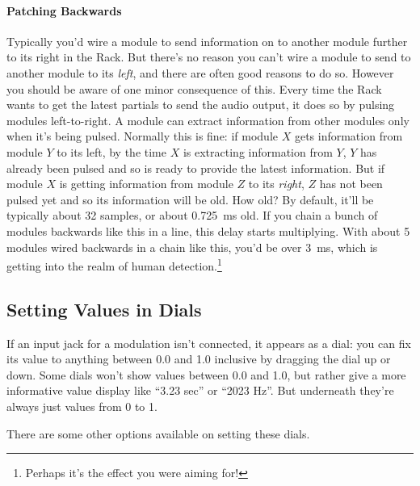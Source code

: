 \documentclass{article}
\begin{document}
\paragraph{Patching Backwards}  Typically you'd wire a module to send information on to another module further to its right in the Rack.  But there's no reason you can't wire a module to send to another module to its {\it left}, and there are often good reasons to do so.  However you should be aware of one minor consequence of this.  Every time the Rack wants to get the latest partials to send the audio output, it does so by pulsing modules left-to-right.  A module can extract information from other modules only when it's being pulsed.  Normally this is fine: if module \(X\) gets information from module \(Y\) to its left, by the time \(X\) is extracting information from \(Y\), \(Y\) has already been pulsed and so is ready to provide the latest information.  But if module \(X\) is getting information from module \(Z\) to its {\it right}, \(Z\) has not been pulsed yet and so its information will be old.  How old?  By default, it'll be typically about 32 samples, or about 0.725~ms old.  If you chain a bunch of modules backwards like this in a line, this delay starts multiplying.   With about 5 modules wired backwards in a chain like this, you'd be over 3~ms, which is getting into the realm of human detection.\footnote{Perhaps it's the effect you were aiming for!} 

\subsection{Setting Values in Dials}

If an input jack for a modulation isn't connected, it appears as a dial: you can fix its value to anything between 0.0 and 1.0 inclusive by dragging the dial up or down.  Some dials won't show values between 0.0 and 1.0, but rather give a more informative value display like ``3.23 sec''  or ``2023 Hz''.  But underneath they're always just values from 0 to 1.

There are some other options available on setting these dials.  
\end{document}
